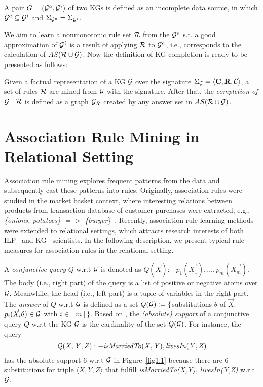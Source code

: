 \begin{definition} A pair $G = (\mathcal{G}^a, \mathcal{G}^i)$ of two KGs is defined as an incomplete data source, in which $\mathcal{G}^a\subseteq \mathcal{G}^i$ and $\Sigma_{\mathcal{G}^a}=\Sigma_{\mathcal{G}^i}$.
\end{definition}

We aim to learn a nonmonotonic rule set $\mathcal{R}$ from the $\mathcal{G}^a$ s.t. a good approximation of $\mathcal{G}^i$ is a result of applying $\mathcal{R}$ to $\mathcal{G}^a$, i.e., corresponds to the calculation of $AS(\mathcal{R} \cup \mathcal{G})$. Now the definition of KG completion is ready to be presented as follows:

\begin{definition}\label{def:graphcompl}
Given a factual representation of a KG $\mathcal{G}$ over the signature $\Sigma_{\mathcal{G}}=\langle\mathbf{C},\mathbf{R},\mathcal{C}\rangle$, a set of rules $\mathcal{R}$ are mined from $\mathcal{G}$ with the signature. After that, the \emph{completion of $\mathcal{G}$ \wrt\ $\mathcal{R}$} is defined as a graph $\mathcal{G}_{\mathcal{R}}$ created by any answer set in $AS(\mathcal{R} \cup \mathcal{G})$.
\end{definition}

\section{Association Rule Mining in Relational Setting}

Association rule mining explores frequent patterns from the data and subsequently cast these patterns into rules. Originally, association rules were studied in the market basket context, where interesting relations between products from transaction database of customer purchases were extracted, e.g., \textit{\{onions, potatoes\} $=>$ \{burger}\}~\cite{ref54}. Recently, association rule learning methods were extended to relational settings, which attracts research interests of both ILP~\cite{ref52} and KG~\cite{ref10} scientists. In the following description, we present typical rule measures for association rules in the relational setting.

A \emph{conjunctive query} $Q$ w.r.t $\mathcal{G}$ is denoted as $Q(\vec{X}):-p_1(\vec{X_1}),\dotsc,p_m(\vec{X_m})$. The body (i.e., right part) of the query is a list of positive or negative atoms over $\mathcal{G}$. Meanwhile, the head (i.e., left part) is a tuple of variables in the right part. The \emph{answer} of $Q$ w.r.t $\mathcal{G}$ is defined as a set $Q(\mathcal{G}):=\{$substitutions $\theta$ of $\vec{X}$: $p_i(\vec{X_i}\theta) \in \mathcal{G}$ with $i \in [m]\}$. Based on \cite{ref53}, the \emph{(absolute) support} of a conjunctive query $Q$ w.r.t the KG $\mathcal{G}$ is the cardinality of the set $Q(\mathcal{G})$. For instance, the query
\begin{equation}\mathit{Q(X,Y,Z):-isMarriedTo(X,Y),\, }\mathit{livesIn(Y,Z)}
\end{equation}
has the absolute support $6$ w.r.t $\mathcal{G}$ in Figure~\ref{fig1.1} because there are $6$ substitutions for triple $\langle X, Y, Z \rangle$ that fulfill \textit{isMarriedTo(X,Y), livesIn(Y,Z)} w.r.t $\mathcal{G}$.

